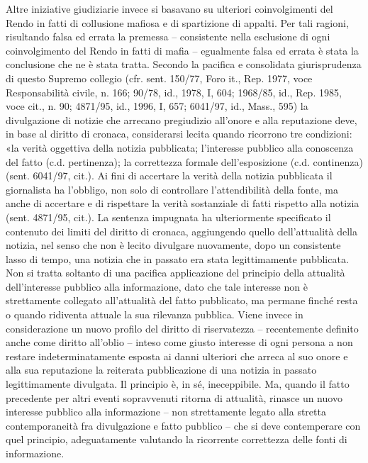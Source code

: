 Altre iniziative giudiziarie invece si basavano su ulteriori coinvolgimenti del Rendo in fatti di collusione mafiosa e di spartizione di appalti.
Per tali ragioni, risultando falsa ed errata la premessa – consistente nella esclusione di ogni coinvolgimento del Rendo in fatti di mafia – egualmente falsa ed errata è stata la conclusione che ne è stata tratta.
Secondo la pacifica e consolidata giurisprudenza di questo Supremo collegio (cfr. sent. 150/77, Foro it., Rep. 1977, voce Responsabilità civile, n. 166; 90/78, id., 1978, I, 604; 1968/85, id., Rep. 1985, voce cit., n. 90; 4871/95, id., 1996, I, 657; 6041/97, id., Mass., 595) la divulgazione di notizie che arrecano pregiudizio all’onore e alla reputazione deve, in base al diritto di cronaca, considerarsi lecita quando ricorrono tre condizioni: «la verità oggettiva della notizia pubblicata; l’interesse pubblico alla conoscenza del fatto (c.d. pertinenza); la correttezza formale dell’esposizione (c.d. continenza) (sent. 6041/97, cit.).
Ai fini di accertare la verità della notizia pubblicata il giornalista ha l’obbligo, non solo di controllare l’attendibilità della fonte, ma anche di accertare e di rispettare la verità sostanziale di fatti rispetto alla notizia (sent. 4871/95, cit.).
La sentenza impugnata ha ulteriormente specificato il contenuto dei limiti del diritto di cronaca, aggiungendo quello dell’attualità della notizia, nel senso che non è lecito divulgare nuovamente, dopo un consistente lasso di tempo, una notizia che in passato era stata legittimamente pubblicata.
Non si tratta soltanto di una pacifica applicazione del principio della attualità dell’interesse pubblico alla informazione, dato che tale interesse non è strettamente collegato all’attualità del fatto pubblicato, ma permane finché resta o quando ridiventa attuale la sua rilevanza pubblica.
Viene invece in considerazione un nuovo profilo del diritto di riservatezza – recentemente definito anche come diritto all’oblio – inteso come giusto interesse di ogni persona a non restare indeterminatamente esposta ai danni ulteriori che arreca al suo onore e alla sua reputazione la reiterata pubblicazione di una notizia in passato legittimamente divulgata.
Il principio è, in sé, ineceppibile.
Ma, quando il fatto precedente per altri eventi sopravvenuti ritorna di attualità, rinasce un nuovo interesse pubblico alla informazione – non strettamente legato alla stretta contemporaneità fra divulgazione e fatto pubblico – che si deve contemperare con quel principio, adeguatamente valutando la ricorrente correttezza delle fonti di informazione.
